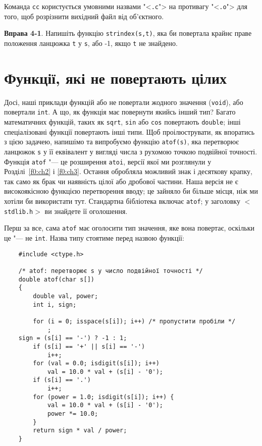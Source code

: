 \documentclass[a4paper,12pt]{book}
\begin{document}
  Команда \texttt{cc} користується умовними назвами "<\texttt{.c}"> на противагу
  "<\texttt{.o}"> для того, щоб розрізнити вихідний файл від об'єктного.

  \textbf{Вправа 4-1}. Напишіть функцію \texttt{strindex(s,t)}, яка би повертала крайнє
  праве положення ланцюжка \texttt{t} у \texttt{s}, або -1, якщо \texttt{t} не знайдено.

\section{Функції, які не повертають цілих}


  Досі, наші приклади функцій або не повертали жодного значення (\texttt{void}), або
  повертали \texttt{int}. А що, як функція має повернути якийсь інший тип? Багато
  математичних функцій, таких як \texttt{sqrt}, \texttt{sin} або \texttt{cos} повертають
  \texttt{double}; інші спеціалізовані функції повертають інші типи. Щоб проілюструвати,
  як впоратись з цією задачею, напишімо та випробуємо функцію \texttt{atof(s)}, яка
  перетворює ланцюжок \texttt{s} у її еквівалент у вигляді числа з рухомою точкою
  подвійної точності. Функція \texttt{atof} "--- це розширення \texttt{atoi}, версії
  якої ми розглянули у Розділі~\ref{f0:ch2} і \ref{f0:ch3}. Остання
  обробляла можливий знак і десяткову крапку, так само як брак чи наявність цілої або
  дробової частини. Наша версія не є високоякісною функцією перетворення вводу; це зайняло
  би більше місця, ніж ми хотіли би використати тут. Стандартна бібліотека включає
  \texttt{atof}; у заголовку \texttt{\mbox{$<$}stdlib.h\mbox{$>$}} ви знайдете її оголошення.

  Перш за все, сама \texttt{atof} має оголосити тип значення, яке вона повертає, оскільки
  це "--- не \texttt{int}. Назва типу стоятиме перед назвою функції:
  \begin{verbatim}
    #include <ctype.h>

    /* atof: перетворює s у число подвійної точності */
    double atof(char s[])
    {
        double val, power;
        int i, sign;

        for (i = 0; isspace(s[i]); i++) /* пропустити пробіли */
            ;
    sign = (s[i] == '-') ? -1 : 1;
        if (s[i] == '+' || s[i] == '-')
            i++;
        for (val = 0.0; isdigit(s[i]); i++)
            val = 10.0 * val + (s[i] - '0');
        if (s[i] == '.')
            i++;
        for (power = 1.0; isdigit(s[i]); i++) {
            val = 10.0 * val + (s[i] - '0');
            power *= 10.0;
        }
        return sign * val / power;
    }
  \end{verbatim}
\end{document}
